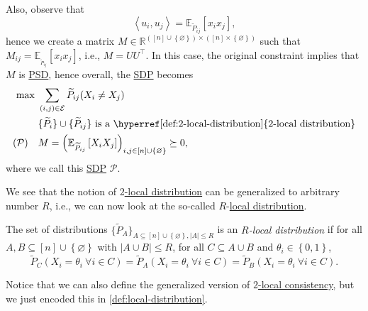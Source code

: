 Also, observe that
\[
	\left\langle u_i, u_j \right\rangle = \mathbb{E}_{\widetilde{P} _{ij}}\left[ x_i x_j\right],
\]
hence we create a matrix \(M\in \mathbb{R} ^{([n] \cup \left\{ \varnothing  \right\} )\times ([n] \times \left\{ \varnothing  \right\} )}\) such that \(M_{ij} = \mathbb{E}_{_{\widetilde{P} _{ij}}}\left[ x_i x_j\right] \), i.e., \(M = U U ^{\top} \). In this case, the original constraint implies that \(M\) is \hyperref[def:PSD]{PSD}, hence overall, the \hyperref[def:SDP]{SDP} becomes
\[
	\begin{aligned}
		\max~               & \sum_{(i, j)\in \mathcal{E} } \widetilde{P} _{ij} (X_i \neq X_j)                                                                     \\
		                    & \{\widetilde{P} _i\}\cup \{\widetilde{P} _{ij}\}\text{ is a \hyperref[def:2-local-distribution]{\(2\)-local distribution}}           \\
		(\mathcal{P} )\quad & M = \left( \mathbb{E}_{\widetilde{P} _{ij}}\left[X_i X_j \right] \right) _{i, j\in [n]\cup \left\{ \varnothing  \right\} }\succeq 0,
	\end{aligned}
\]
where we call this \hyperref[def:SDP]{SDP} \(\mathcal{P} \).

We see that the notion of \hyperref[def:2-local-distribution]{\(2\)-local distribution} can be generalized to arbitrary number \(R\), i.e., we can now look at the so-called \(R\)-\hyperref[def:local-distribution]{local distribution}.

\begin{definition}\label{def:local-distribution}
	The set of distributions \(\{ \widetilde{P} _A \}_{A \subseteq [n] \cup \left\{ \varnothing  \right\}, \left\vert A \right\vert \leq R} \) is an \emph{\(R\)-local distribution} if for all \(A, B \subseteq [n]\cup \left\{ \varnothing  \right\} \) with \(\left\vert A \cup B \right\vert \leq R\), for all \(C \subseteq A \cup B\) and \(\theta _i \in \left\{ 0, 1 \right\} \),
	\[
		\widetilde{P} _C (X_i = \theta _i\ \forall i\in C)
		= \widetilde{P} _A (X_i = \theta _i\ \forall i\in C)
		= \widetilde{P} _B (X_i = \theta _i\ \forall i\in C).
	\]
\end{definition}
\begin{note}
	Notice that we can also define the generalized version of \hyperref[def:2-local-consistency]{\(2\)-local consistency}, but we just encoded this in \autoref{def:local-distribution}.
\end{note}

